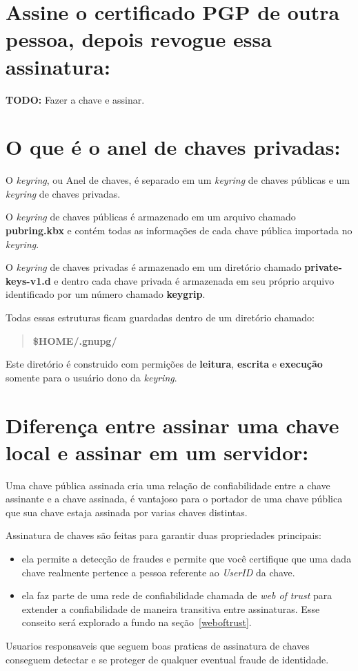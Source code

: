 \documentclass[12pt, letterpaper]{article}
\begin{document}
\section{Assine o certificado PGP de outra pessoa,
depois revogue essa assinatura:}

\textbf{TODO:} Fazer a chave e assinar.

\section{O que é o anel de chaves privadas:}

O \textit{keyring}, ou Anel de chaves, é separado em
um \textit{keyring} de chaves públicas e um \textit{keyring}
de chaves privadas.

O \textit{keyring} de chaves públicas é armazenado
em um arquivo chamado \textbf{pubring.kbx} e contém
todas as informações de cada chave pública importada
no \textit{keyring}.

O \textit{keyring} de chaves privadas é armazenado
em um diretório chamado \textbf{private-keys-v1.d}
e dentro cada chave privada é armazenada em seu
próprio arquivo identificado por um número chamado
\textbf{keygrip}.

Todas essas estruturas ficam guardadas dentro de
um diretório chamado:
\begin{quote}
  \textbf{\$HOME/.gnupg/}
\end{quote}
Este diretório é construido com permições de \textbf{leitura}, \textbf{escrita}
e \textbf{execução} somente para o usuário dono da \textit{keyring}.

\section{Diferença entre assinar uma chave local e assinar em um servidor:}

Uma chave pública assinada cria uma relação de confiabilidade entre
a chave assinante e a chave assinada, é vantajoso para o portador de
uma chave pública que sua chave estaja assinada por varias chaves distintas.

Assinatura de chaves são feitas para garantir duas propriedades principais:
\begin{itemize}
    \item ela permite a detecção de fraudes e permite que você certifique
      que uma dada chave realmente pertence a pessoa referente ao \textit{UserID}
      da chave.
    \item ela faz parte de uma rede de confiabilidade chamada de \textit{web of trust}
      para extender a confiabilidade de maneira transitiva entre assinaturas. Esse conseito
      será explorado a fundo na seção~\ref{weboftrust}.
\end{itemize}
Usuarios responsaveis que seguem boas praticas de assinatura de chaves conseguem
detectar e se proteger de qualquer eventual fraude de identidade.
\end{document}
